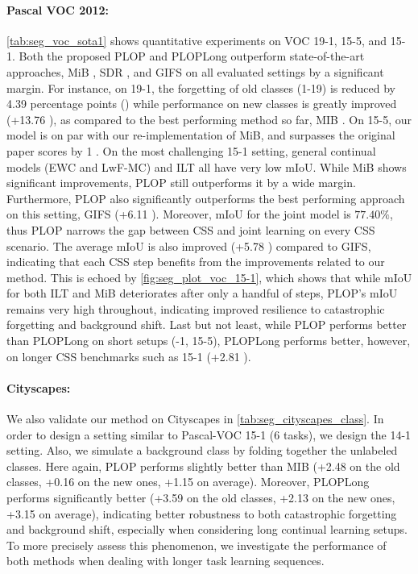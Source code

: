 \paragraph{Pascal VOC 2012:} \autoref{tab:seg_voc_sota1} shows quantitative experiments on
VOC 19-1, 15-5, and 15-1. Both the proposed PLOP and PLOPLong outperform state-of-the-art
approaches, MiB \citep{cermelli2020modelingthebackground}, SDR \citep{michieli2021sdr}, and GIFS
\citep{cermelli2020fewshotcontinualsegm} on all evaluated settings by a significant margin. For
instance, on 19-1, the forgetting of old classes (1-19) is reduced by 4.39 percentage points (\pp)
while performance on new classes is greatly improved (+13.76 \pp), as compared to the best
performing method so far, MIB \citep{cermelli2020modelingthebackground}. On 15-5, our model is on par
with our re-implementation of MiB, and surpasses the original paper scores
\citep{cermelli2020modelingthebackground} by 1 \pp. On the most challenging 15-1 setting, general
continual models (EWC and LwF-MC) and ILT all have very low \ac{mIoU}. While MiB shows significant
improvements, PLOP still outperforms it by a wide margin. Furthermore, PLOP also significantly
outperforms the best performing approach on this setting, GIFS
\cite{cermelli2020fewshotcontinualsegm} (+6.11 \pp). Moreover, \ac{mIoU} for the joint model is
$77.40\%$, thus PLOP narrows the gap between \ac{CSS} and joint learning on every \ac{CSS} scenario. The
average \ac{mIoU} is also improved (+5.78 \pp) compared to GIFS, indicating that each \ac{CSS} step
benefits from the improvements related to our method. This is echoed by
\autoref{fig:seg_plot_voc_15-1}, which shows that while \ac{mIoU} for both ILT and MiB deteriorates
after only a handful of steps, PLOP's \ac{mIoU} remains very high throughout, indicating improved
resilience to catastrophic forgetting and background shift. Last but not least, while PLOP performs
better than PLOPLong on short setups (-1, 15-5), PLOPLong performs better, however, on longer
\ac{CSS} benchmarks such as 15-1 (+2.81 \pp).



\paragraph{Cityscapes:} We also validate our method on Cityscapes in
\autoref{tab:seg_cityscapes_class}. In order to design a setting similar to Pascal-VOC 15-1 (6
tasks), we design the 14-1 setting. Also, we simulate a background class by folding together the
unlabeled classes. Here again, PLOP performs slightly better than MIB (+2.48 \pp on the old classes,
+0.16 \pp on the new ones, +1.15 \pp on average). Moreover, PLOPLong performs significantly better
(+3.59 \pp on the old classes, +2.13 \pp on the new ones, +3.15 \pp on average), indicating better
robustness to both catastrophic forgetting and background shift, especially when considering long
continual learning setups. To more precisely assess this phenomenon, we investigate the performance
of both methods when dealing with longer task learning sequences.

